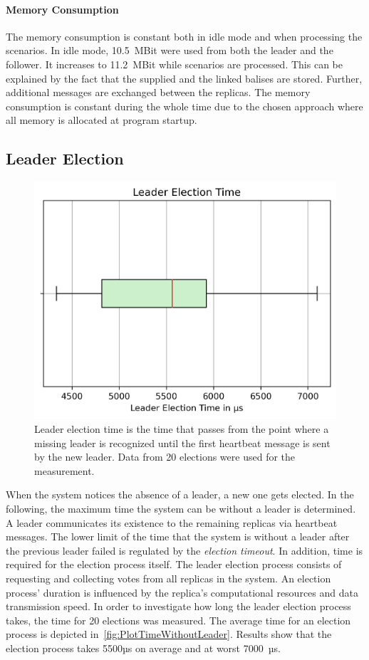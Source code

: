 \paragraph{Memory Consumption}
The memory consumption is constant both in idle mode and when processing the scenarios.
In idle mode, 10.5~MBit were used from both the leader and the follower.
It increases to 11.2~MBit while scenarios are processed.
This can be explained by the fact that the supplied  and the linked balises are stored.
Further, additional messages are exchanged between the replicas.
The memory consumption is constant during the whole time due to the chosen approach where all memory is allocated at program startup.


\subsection{Leader Election}
\label{subsec:LeaderElectionEval}
\begin{figure}[!htb]
	\centering
	\includegraphics[width=0.8\linewidth]{images/plots/timeWithoutLeader}
	\caption{Leader election time is the time that passes from the point where a missing leader is recognized until the first heartbeat message is sent by the new leader. Data from 20 elections were used for the measurement.}
	\label{fig:PlotTimeWithoutLeader}
\end{figure}

When the system notices the absence of a leader, a new one gets elected.
In the following, the maximum time the system can be without a leader is determined.
\\

A leader communicates its existence to the remaining replicas via heartbeat messages.
The lower limit of the time that the system is without a leader after the previous leader failed is regulated by the \textit{election timeout}.
In addition, time is required for the election process itself.
The leader election process consists of requesting and collecting votes from all replicas in the system.
An election process' duration is influenced by the replica's computational resources and data transmission speed.
In order to investigate how long the leader election process takes, the time for 20 elections was measured.
The average time for an election process is depicted in~\autoref{fig:PlotTimeWithoutLeader}.
Results show that the election process takes 5500µs on average and at worst 7000~µs.
\\


